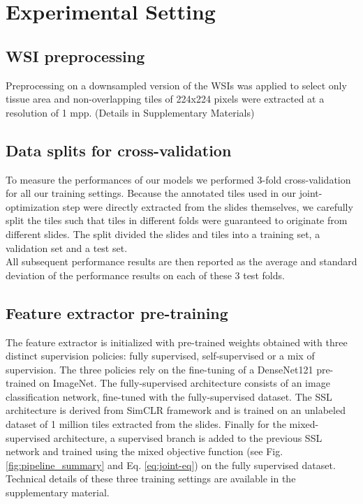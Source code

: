 \section{Experimental Setting}

\subsection{WSI preprocessing}

Preprocessing on a downsampled version of the WSIs was applied to select only tissue area and non-overlapping tiles of 224x224 pixels were extracted at a resolution of 1 mpp. (Details in Supplementary Materials)

\subsection{Data splits for cross-validation}
To measure the performances of our models we performed 3-fold cross-validation for all our training settings. Because the annotated tiles used in our joint-optimization step were directly extracted from the slides themselves, we carefully split the tiles such that tiles in different folds were guaranteed to originate from different slides. The split divided the slides and tiles into a training set, a validation set and a test set. \\ 
All subsequent performance results are then reported as the average and standard deviation of the performance results on each of these 3 test folds.

\subsection{Feature extractor pre-training}
The feature extractor is initialized with pre-trained weights obtained with three distinct supervision policies: fully supervised, self-supervised or a mix of supervision. The three policies rely on the fine-tuning of a DenseNet121 \citep{huang_densely_2016} pre-trained on ImageNet. The fully-supervised architecture consists of an image classification network, fine-tuned with the fully-supervised dataset. The SSL architecture is derived from SimCLR framework and is trained on an unlabeled dataset of 1 million tiles extracted from the slides. Finally for the mixed-supervised architecture, a supervised branch is added to the previous SSL network and trained using the mixed objective function (see Fig. \ref{fig:pipeline_summary} and Eq. \ref{eq:joint-eq}) on the fully supervised dataset. Technical details of these three training settings are available in the supplementary material.


